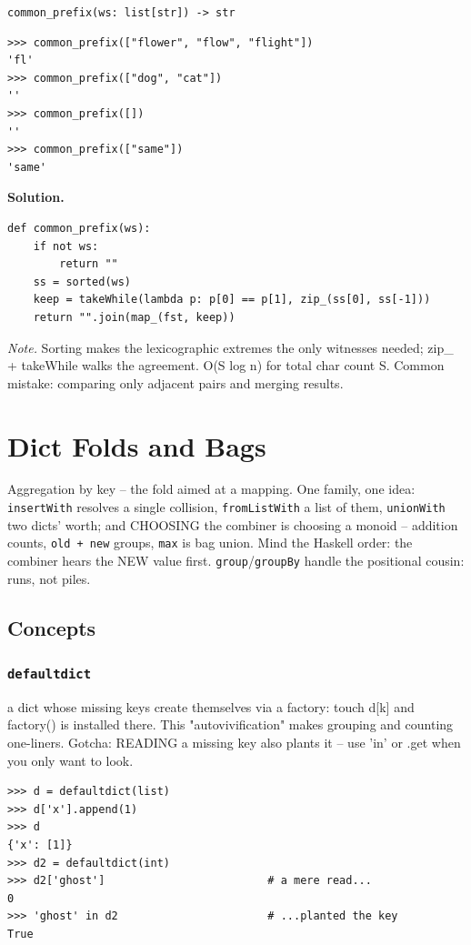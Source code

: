 \documentclass[10pt,letterpaper]{book}
\begin{document}
\noindent\texttt{common\_prefix(ws: list[str]) -> str}
\begin{lstlisting}[style=ex]
>>> common_prefix(["flower", "flow", "flight"])
'fl'
>>> common_prefix(["dog", "cat"])
''
>>> common_prefix([])
''
>>> common_prefix(["same"])
'same'
\end{lstlisting}
\noindent\textbf{Solution.}
\begin{lstlisting}[style=code]
def common_prefix(ws):
    if not ws:
        return ""
    ss = sorted(ws)
    keep = takeWhile(lambda p: p[0] == p[1], zip_(ss[0], ss[-1]))
    return "".join(map_(fst, keep))
\end{lstlisting}
\noindent\textit{Note.} Sorting makes the lexicographic extremes the only witnesses needed; zip\_ + takeWhile walks the agreement. O(S log n) for total char count S. Common mistake: comparing only adjacent pairs and merging results.

\clearpage
\chapter{Dict Folds and Bags}

Aggregation by key -- the fold aimed at a mapping. One family, one idea:
\texttt{insertWith} resolves a single collision, \texttt{fromListWith} a
list of them, \texttt{unionWith} two dicts' worth; and CHOOSING the combiner
is choosing a monoid -- addition counts, \texttt{old + new} groups,
\texttt{max} is bag union. Mind the Haskell order: the combiner hears the
NEW value first. \texttt{group}/\texttt{groupBy} handle the positional
cousin: runs, not piles.
\section{Concepts}
\subsection{\texttt{defaultdict}}\label{def:defaultdict}
a dict whose missing keys create themselves via a factory: touch d[k] and factory() is installed there. This "autovivification" makes grouping and counting one-liners. Gotcha: READING a missing key also plants it -- use 'in' or .get when you only want to look.
\begin{lstlisting}[style=ex]
>>> d = defaultdict(list)
>>> d['x'].append(1)
>>> d
{'x': [1]}
>>> d2 = defaultdict(int)
>>> d2['ghost']                         # a mere read...
0
>>> 'ghost' in d2                       # ...planted the key
True
\end{lstlisting}
\end{document}
